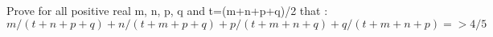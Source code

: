 Prove for all positive real m, n, p, q and t=(m+n+p+q)/2 that :$ m/(t+n+p+q)+n/(t+m+p+q)+p/(t+m+n+q)+q/(t+m+n+p)=>4/5 $